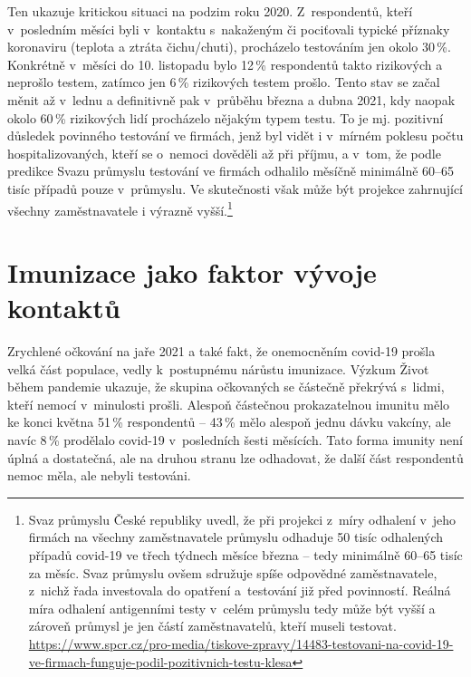 Ten ukazuje kritickou situaci na podzim roku 2020. Z respondentů, kteří v posledním měsíci byli v kontaktu s nakaženým či pociťovali typické příznaky koronaviru (teplota a ztráta čichu/chuti), procházelo testováním jen okolo 30\,\%. Konkrétně v měsíci do 10. listopadu bylo 12\,\% respondentů takto rizikových a neprošlo testem, zatímco jen 6\,\% rizikových testem prošlo. Tento stav se začal měnit až v lednu a definitivně pak v průběhu března a dubna 2021, kdy naopak okolo 60\,\% rizikových lidí procházelo nějakým typem testu. To je mj. pozitivní důsledek
povinného testování ve firmách, jenž byl vidět i v mírném poklesu počtu hospitalizovaných, kteří se o~nemoci dověděli až při příjmu, a v tom, že podle predikce Svazu průmyslu testování ve firmách odhalilo měsíčně minimálně 60--65 tisíc případů pouze v průmyslu. Ve skutečnosti však může být projekce zahrnující všechny zaměstnavatele i výrazně vyšší.\footnote{Svaz průmyslu České republiky uvedl, že při projekci z míry odhalení v jeho firmách na všechny zaměstnavatele průmyslu odhaduje 50 tisíc odhalených případů covid-19 ve třech týdnech měsíce března – tedy minimálně 60--65 tisíc za měsíc. Svaz průmyslu ovšem sdružuje spíše odpovědné zaměstnavatele, z nichž řada investovala do opatření a testování již před povinností. Reálná míra odhalení antigenními testy v celém průmyslu tedy může být vyšší a zároveň průmysl je jen částí zaměstnavatelů, kteří museli testovat. \url{https://www.spcr.cz/pro-media/tiskove-zpravy/14483-testovani-na-covid-19-ve-firmach-funguje-podil-pozitivnich-testu-klesa}}

\section*{Imunizace jako faktor vývoje kontaktů}

Zrychlené očkování na jaře 2021 a také fakt, že onemocněním covid-19 prošla velká část populace, vedly k postupnému nárůstu imunizace. Výzkum Život během pandemie ukazuje, že skupina očkovaných se částečně překrývá s lidmi, kteří nemocí v minulosti prošli. Alespoň částečnou prokazatelnou imunitu mělo ke konci května 51\,\% respondentů – 43\,\% mělo alespoň jednu dávku vakcíny, ale navíc 8\,\% prodělalo covid-19 v posledních šesti měsících. Tato forma imunity není úplná a dostatečná, ale na druhou stranu lze odhadovat, že další část respondentů nemoc měla, ale nebyli testováni.

